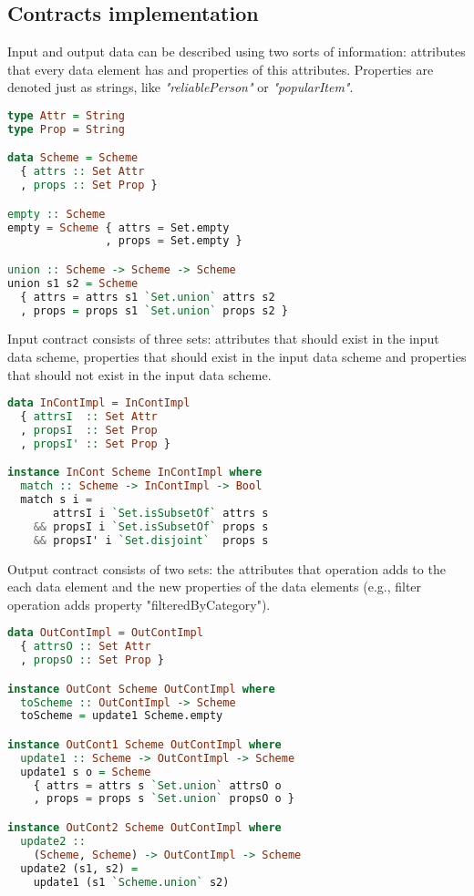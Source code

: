 \subsection{Contracts implementation}

Input and output data can be described using two sorts of information: attributes that every data element has and properties of this attributes.
Properties are denoted just as strings, like {\em "reliablePerson"} or {\em "popularItem"}.

\begin{lstlisting}[language=Haskell]
type Attr = String
type Prop = String

data Scheme = Scheme
  { attrs :: Set Attr
  , props :: Set Prop }

empty :: Scheme
empty = Scheme { attrs = Set.empty
               , props = Set.empty }

union :: Scheme -> Scheme -> Scheme
union s1 s2 = Scheme
  { attrs = attrs s1 `Set.union` attrs s2
  , props = props s1 `Set.union` props s2 }
\end{lstlisting}

Input contract consists of three sets: 
attributes that should exist in the input data scheme,
properties that should exist in the input data scheme
and properties that should not exist in the input data scheme.

\begin{lstlisting}[language=Haskell]
data InContImpl = InContImpl
  { attrsI  :: Set Attr
  , propsI  :: Set Prop
  , propsI' :: Set Prop }

instance InCont Scheme InContImpl where
  match :: Scheme -> InContImpl -> Bool
  match s i =
       attrsI i `Set.isSubsetOf` attrs s
    && propsI i `Set.isSubsetOf` props s
    && propsI' i `Set.disjoint`  props s
\end{lstlisting}

Output contract consists of two sets: 
the attributes that operation adds to the each data element
and 
the new properties of the data elements (e.g., filter operation adds property "filteredByCategory").

\begin{lstlisting}[language=Haskell]
data OutContImpl = OutContImpl
  { attrsO :: Set Attr
  , propsO :: Set Prop }

instance OutCont Scheme OutContImpl where
  toScheme :: OutContImpl -> Scheme
  toScheme = update1 Scheme.empty

instance OutCont1 Scheme OutContImpl where
  update1 :: Scheme -> OutContImpl -> Scheme
  update1 s o = Scheme
    { attrs = attrs s `Set.union` attrsO o
    , props = props s `Set.union` propsO o }

instance OutCont2 Scheme OutContImpl where
  update2 :: 
    (Scheme, Scheme) -> OutContImpl -> Scheme
  update2 (s1, s2) = 
    update1 (s1 `Scheme.union` s2)
\end{lstlisting}

